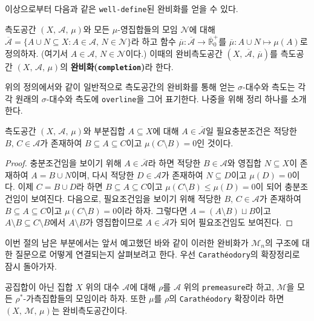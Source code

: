 이상으로부터 다음과 같은 \texttt{well-define}된 완비화를 얻을 수 있다.

\begin{definition}
    측도공간 $(X,\,\mathcal{A},\,\mu)$와 모든 $\mu$-영집합들의 모임 $\mathcal{N}$에 대해 $\overline{\mathcal{A}}=\{A\cup N\subseteq X:A\in\mathcal{A},\,N\in\mathcal{N}\}$라 하고 함수 $\overline{\mu}:\overline{\mathcal{A}}\to\overline{\mathbb{R}}^+_0$를 $\overline{\mu}:A\cup N\mapsto\mu(A)$로 정의하자. (여기서 $A\in\mathcal{A},\,N\in\mathcal{N}$이다.) 이때의 완비측도공간 $(X,\,\overline{\mathcal{A}},\,\overline{\mu})$를 측도공간 $(X,\,\mathcal{A},\,\mu)$의 \textbf{완비화(\texttt{completion})}라 한다.
\end{definition}

위의 정의에서와 같이 일반적으로 측도공간의 완비화를 통해 얻는 $\sigma$-대수와 측도는 각각 원래의 $\sigma$-대수와 측도에 \texttt{overline}을 그어 표기한다. 나중을 위해 정리 하나를 소개한다.

\begin{theorem}\label{thm:Complete2}
    측도공간 $(X,\,\mathcal{A},\,\mu)$와 부분집합 $A\subseteq X$에 대해 $A\in\overline{\mathcal{A}}$일 필요충분조건은 적당한 $B,\,C\in\mathcal{A}$가 존재하여 $B\subseteq A\subseteq C$이고 $\mu(C\setminus B)=0$인 것이다.
\end{theorem}

\begin{proof}
    충분조건임을 보이기 위해 $A\in\overline{\mathcal{A}}$라 하면 적당한 $B\in\mathcal{A}$와 영집합 $N\subseteq X$이 존재하여 $A=B\cup N$이며, 다시 적당한 $D\in\mathcal{A}$가 존재하여 $N\subseteq D$이고 $\mu(D)=0$이다. 이제 $C=B\cup D$라 하면 $B\subseteq A\subseteq C$이고 $\mu(C\setminus B)\leq\mu(D)=0$이 되어 충분조건임이 보여진다. 다음으로, 필요조건임을 보이기 위해 적당한 $B,\,C\in\mathcal{A}$가 존재하여 $B\subseteq A\subseteq C$이고 $\mu(C\setminus B)=0$이라 하자. 그렇다면 $A=(A\setminus B)\sqcup B$이고 $A\setminus B\subseteq C\setminus B$에서 $A\setminus B$가 영집합이므로 $A\in\overline{\mathcal{A}}$가 되어 필요조건임도 보여진다.
\end{proof}

이번 절의 남은 부분에서는 앞서 예고했던 바와 같이 이러한 완비화가 $\mathcal{M}_n$의 구조에 대한 질문으로 어떻게 연결되는지 살펴보려고 한다. 우선 \texttt{Carath\'eodory}의 확장정리로 잠시 돌아가자.

\begin{theorem}\label{thm:CaratheodoryComplete}
    공집합이 아닌 집합 $X$ 위의 대수 $\mathcal{A}$에 대해 $\rho$를 $\mathcal{A}$ 위의 \texttt{premeasure}라 하고, $\mathcal{M}$을 모든 $\rho^*$-가측집합들의 모임이라 하자. 또한 $\mu$를 $\rho$의 \texttt{Carath\'eodory} 확장이라 하면 $(X,\,\mathcal{M},\,\mu)$는 완비측도공간이다.
\end{theorem}

